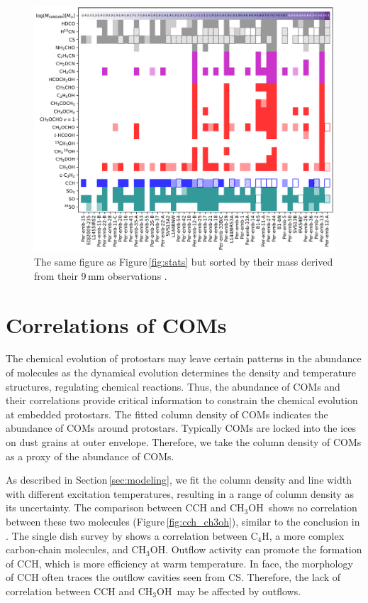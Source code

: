 \documentclass[twocolumn]{aastex62}
\newcommand{\methanol}{\mbox{CH$_{3}$OH}}
\begin{document}
\begin{figure}[htbp!]
  \includegraphics[width=\textwidth]{stats_sorted_by_Mcont.pdf}
  \caption{The same figure as Figure\,\ref{fig:stats} but sorted by their mass derived from their 9\,mm observations \citep{2018ApJS..238...19T}.}
\end{figure}
\renewcommand{\thefigure}{\arabic{figure}}

\section{Correlations of COMs}
The chemical evolution of protostars may leave certain patterns in the abundance of molecules as the dynamical evolution determines the density and temperature structures, regulating chemical reactions.  Thus, the abundance of COMs and their correlations provide critical information to constrain the chemical evolution at embedded protostars.  The fitted column density of COMs indicates the abundance of COMs around protostars.  Typically COMs are locked into the ices on dust grains at outer envelope. Therefore, we take the column density of COMs as a proxy of the abundance of COMs.  

As described in Section\,\ref{sec:modeling}, we fit the column density and line width with different excitation temperatures, resulting in a range of column density as its uncertainty.  The comparison between CCH and \methanol\ shows no correlation between these two molecules (Figure\,\ref{fig:cch_ch3oh}), similar to the conclusion in \citet{2018ApJS..236...52H}.  The single dish survey by \citet{2016ApJ...833..125G} shows a correlation between C$_{4}$H, a more complex carbon-chain molecules, and \methanol.  Outflow activity can promote the formation of CCH, which is more efficiency at warm temperature.  In face, the morphology of CCH often traces the outflow cavities seen from CS.  Therefore, the lack of correlation between CCH and \methanol\ may be affected by outflows.
\end{document}
